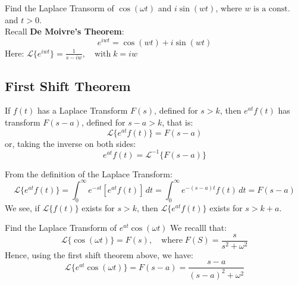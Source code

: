 \documentclass[a4paper]{article}
\theoremstyle{definition}
\theoremstyle{plain}
\begin{document}
\begin{examplebox}[Example]
  Find the Laplace Transorm of $\cos(\omega t)$ and $i\sin(wt)$, where $w  \text{ is a const.}$ and  $t > 0$. \\
  Recall \textbf{De Moivre's Theorem}:
  $$e^{iwt} = \cos(wt) + i\sin(wt)$$ 
  Here: $\mathcal{L}\{e^{iwt}\} = \frac{1}{s-iw}, \quad \text{with} \; k = iw$
\end{examplebox}

\newpage
\subsection{First Shift Theorem}
\begin{theorembox}
  If $f(t)$ has a Laplace Transform $F(s)$, defined for $s > k$, then $e^{at}f(t)$ has transform $F(s-a)$, defined for $s-a > k$, that is:
  $$\mathcal{L}\{e^{at}f(t)\} = F(s-a)$$
  or, taking the inverse on both sides:
  $$e^{at}f(t) = \mathcal{L}^{-1}\{F(s-a)\}$$
\end{theorembox}
\begin{proofbox}
  From the definition of the Laplace Transform:
  $$\mathcal{L}\{e^{at}f(t)\} = \int_0^\infty e^{-st}[e^{at}f(t)] \, dt =  \int_0^\infty e^{-(s-a)t} f(t) \, dt = F(s-a)$$
  We see, if $\mathcal{L}\{f(t)\}$ exists for $s > k$, then $\mathcal{L}\{e^{at}f(t)\}$ exists for $s > k + a$.
\end{proofbox}

\begin{examplebox}[Example]
  Find the Laplace Transform of $e^{at} \cos(\omega t)$
  We recalll that:
  $$\mathcal{L}\{\cos(\omega t)\} = F(s), \quad \text{where} \; F(S) = \dfrac{s}{s^2 + \omega ^2}$$
  Hence, using the first shift theorem above, we have:
  $$\mathcal{L}\{e^{at} \cos(\omega t)\} = F(s-a) = \dfrac{s-a}{(s-a)^2 + \omega^2}$$
\end{examplebox}
\end{document}
